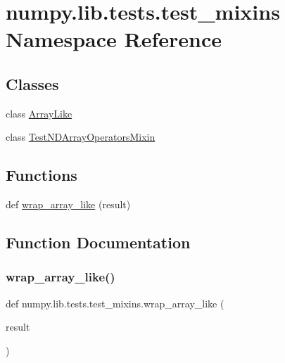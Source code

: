 \hypertarget{namespacenumpy_1_1lib_1_1tests_1_1test__mixins}{}\section{numpy.\+lib.\+tests.\+test\+\_\+mixins Namespace Reference}
\label{namespacenumpy_1_1lib_1_1tests_1_1test__mixins}
\subsection*{Classes}
\begin{DoxyCompactItemize}
\item 
class \hyperlink{classnumpy_1_1lib_1_1tests_1_1test__mixins_1_1ArrayLike}{Array\+Like}
\item 
class \hyperlink{classnumpy_1_1lib_1_1tests_1_1test__mixins_1_1TestNDArrayOperatorsMixin}{Test\+N\+D\+Array\+Operators\+Mixin}
\end{DoxyCompactItemize}
\subsection*{Functions}
\begin{DoxyCompactItemize}
\item 
def \hyperlink{namespacenumpy_1_1lib_1_1tests_1_1test__mixins_a69dbc3be1626248b19f4428cf73679a7}{wrap\+\_\+array\+\_\+like} (result)
\end{DoxyCompactItemize}


\subsection{Function Documentation}
\mbox{\label{namespacenumpy_1_1lib_1_1tests_1_1test__mixins_a69dbc3be1626248b19f4428cf73679a7}} 
\subsubsection{\texorpdfstring{wrap\+\_\+array\+\_\+like()}{wrap\_array\_like()}}
{\footnotesize\ttfamily def numpy.\+lib.\+tests.\+test\+\_\+mixins.\+wrap\+\_\+array\+\_\+like (\begin{DoxyParamCaption}\item[{}]{result }\end{DoxyParamCaption})}

